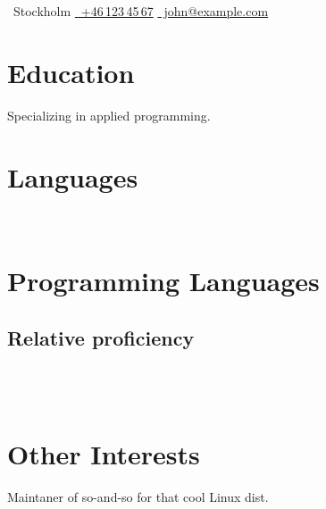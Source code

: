 \documentclass{linderothcv}
\begin{document}
\begin{lcvheader}[name=John Smith]
    \centerline{
        \sffamily
        \faMapMarker~Stockholm\hspace{1em}
        \href{tel:+461234567}{\faPhone~+46\,123\,45\,67}\hspace{1em}
        \href{mailto:john@example.com}{\faAt~john@example.com}
    }
\end{lcvheader}


\begin{lcvleftcolumn}

\section{Education}

Specializing in applied programming.

\section{Languages}

\\


\section{Programming Languages}
\subsection{Relative proficiency}

 \\
 \\

\section{Other Interests}

Maintaner of so-and-so for that cool Linux dist.


\end{lcvleftcolumn}
\end{document}
